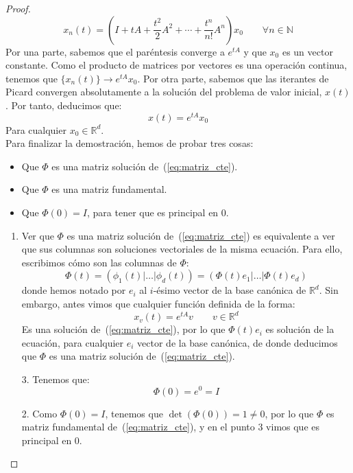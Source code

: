 \begin{prop}
\begin{proof}
\begin{equation*}
            x_n(t) = \left(I + tA + \dfrac{t^2}{2}A^2 + \cdots + \dfrac{t^n}{n!}A^n\right) x_0 \qquad \forall n\in \mathbb{N}
        \end{equation*}
        Por una parte, sabemos que el paréntesis converge a $e^{tA}$ y que $x_0$ es un vector constante. Como el producto de matrices por vectores es una operación continua, tenemos que $\{x_n(t)\}\rightarrow e^{tA}x_0$. Por otra parte, sabemos que las iterantes de Picard convergen absolutamente a la solución del problema de valor inicial, $x(t)$. Por tanto, deducimos que:
        \begin{equation*}
            x(t) = e^{tA} x_0
        \end{equation*}
        Para cualquier $x_0\in \mathbb{R}^d$.\\

        Para finalizar la demostración, hemos de probar tres cosas:
        \begin{itemize}
            \item Que $\Phi$ es una matriz solución de~(\ref{eq:matriz_cte}).
            \item Que $\Phi$ es una matriz fundamental.
            \item Que $\Phi(0) = I$, para tener que es principal en 0.
        \end{itemize}

        \begin{enumerate}
            \item Ver que $\Phi$ es una matriz solución de~(\ref{eq:matriz_cte}) es equivalente a ver que sus columnas son soluciones vectoriales de la misma ecuación. Para ello, escribimos cómo son las columnas de $\Phi$:
                \begin{equation*}
                    \Phi(t) = (\phi_1(t)|\ldots|\phi_d(t)) = (\Phi(t)e_1|\ldots|\Phi(t)e_d)
                \end{equation*}
                donde hemos notado por $e_i$ al $i$-ésimo vector de la base canónica de $\mathbb{R}^d$. Sin embargo, antes vimos que cualquier función definida de la forma:
                \begin{equation*}
                    x_v(t) = e^{tA} v \qquad v\in \mathbb{R}^d
                \end{equation*}
                Es una solución de~(\ref{eq:matriz_cte}), por lo que $\Phi(t)e_i$ es solución de la ecuación, para cualquier $e_i$ vector de la base canónica, de donde deducimos que $\Phi$ es una matriz solución de~(\ref{eq:matriz_cte}).
            \item[3.] Tenemos que:
                \begin{equation*}
                    \Phi(0) = e^0 = I
                \end{equation*}
            \item[2.] Como $\Phi(0) = I$, tenemos que $\det(\Phi(0))=1\neq 0$, por lo que $\Phi$ es matriz fundamental de~(\ref{eq:matriz_cte}), y en el punto 3 vimos que es principal en 0.
        \end{enumerate}
    \end{proof}
\end{prop}
